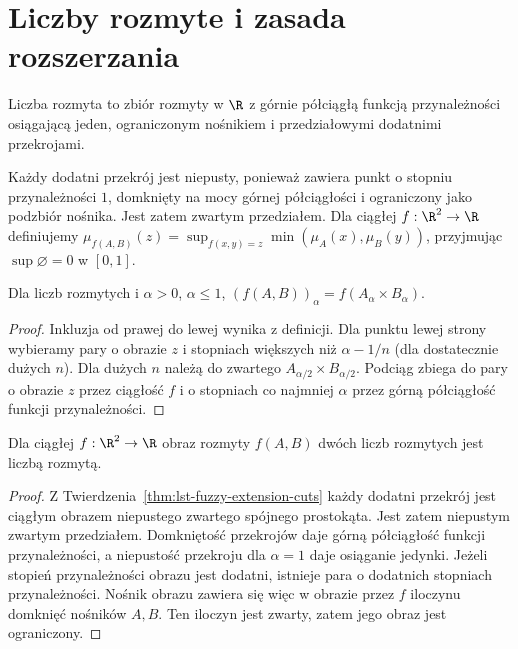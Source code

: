 \section{Liczby rozmyte i zasada rozszerzania}
\begin{definicja}\label{def:ncl-fuzzy-number}
Liczba rozmyta to zbiór rozmyty w $\R$ z górnie półciągłą funkcją
przynależności osiągającą jeden, ograniczonym nośnikiem i przedziałowymi
dodatnimi przekrojami.
\end{definicja}
Każdy dodatni przekrój jest niepusty, ponieważ zawiera punkt
o stopniu przynależności $1$, domknięty na mocy górnej
półciągłości i ograniczony jako podzbiór nośnika.
Jest zatem zwartym przedziałem.
Dla ciągłej $f:\R^2\to\R$ definiujemy
$\mu_{f(A,B)}(z)=\sup_{f(x,y)=z}\min(\mu_A(x),\mu_B(y))$,
przyjmując $\sup\varnothing=0$ w $[0,1]$.
\begin{twierdzenie}\label{thm:lst-fuzzy-extension-cuts}
Dla liczb rozmytych i $\alpha>0$, $\alpha\leq1$,
$(f(A,B))_\alpha=f(A_\alpha\times B_\alpha)$.
\end{twierdzenie}
\begin{proof}
Inkluzja od prawej do lewej wynika z definicji. Dla punktu
lewej strony wybieramy pary o obrazie $z$ i stopniach większych niż
$\alpha-1/n$ (dla dostatecznie dużych $n$). Dla dużych $n$ należą do zwartego
$A_{\alpha/2}\times B_{\alpha/2}$. Podciąg zbiega do pary
o obrazie $z$ przez ciągłość $f$ i o stopniach co najmniej $\alpha$
przez górną półciągłość funkcji przynależności.
\end{proof}
\begin{wniosek}\label{cor:lst-fuzzy-extension-number}
Dla ciągłej $f:\R^2\to\R$ obraz rozmyty $f(A,B)$
dwóch liczb rozmytych jest liczbą rozmytą.
\end{wniosek}
\begin{proof}
Z Twierdzenia~\ref{thm:lst-fuzzy-extension-cuts} każdy
dodatni przekrój jest ciągłym obrazem niepustego
zwartego spójnego prostokąta. Jest zatem niepustym
zwartym przedziałem. Domkniętość przekrojów daje
górną półciągłość funkcji przynależności, a niepustość
przekroju dla $\alpha=1$ daje osiąganie jedynki.
Jeżeli stopień przynależności obrazu jest dodatni,
istnieje para o dodatnich stopniach przynależności.
Nośnik obrazu zawiera się więc w obrazie przez $f$
iloczynu domknięć nośników $A,B$. Ten iloczyn jest
zwarty, zatem jego obraz jest ograniczony.
\end{proof}

